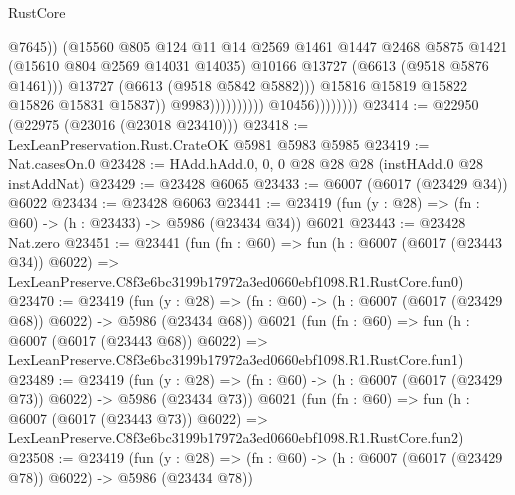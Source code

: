 \begin{lexlean}{RustCore}
\begin{coremodule}
                                                  @7645))
                                              (@15560
                                                @805
                                                @124
                                                @11
                                                @14
                                                @2569
                                                @1461
                                                @1447
                                                @2468
                                                @5875
                                                @1421
                                                (@15610 @804 @2569 @14031 @14035)
                                                @10166
                                                @13727
                                                (@6613 (@9518 @5876 @1461)))
                                              @13727
                                              (@6613 (@9518 @5842 @5882)))
                                            @15816
                                            @15819
                                            @15822
                                            @15826
                                            @15831
                                            @15837))
                                        @9983))))))))))
                    @10456))))))))
@23414 := @22950 (@22975 (@23016 (@23018 @23410)))
@23418 := LexLeanPreservation.Rust.CrateOK @5981 @5983 @5985
@23419 := Nat.casesOn.{0}
@23428 := HAdd.hAdd.{0, 0, 0} @28 @28 @28 (instHAdd.{0} @28 instAddNat)
@23429 := @23428 @6065
@23433 := @6007 (@6017 (@23429 @34)) @6022
@23434 := @23428 @6063
@23441 := @23419 (fun (y : @28) => (fn : @60) -> (h : @23433) -> @5986 (@23434 @34)) @6021
@23443 := @23428 Nat.zero
@23451 := @23441
    (fun (fn : @60) =>
    fun (h : @6007 (@6017 (@23443 @34)) @6022) =>
    LexLeanPreserve.C8f3e6bc3199b17972a3ed0660ebf1098.R1.RustCore.fun0)
@23470 := @23419
    (fun (y : @28) => (fn : @60) -> (h : @6007 (@6017 (@23429 @68)) @6022) -> @5986 (@23434 @68))
    @6021
    (fun (fn : @60) =>
    fun (h : @6007 (@6017 (@23443 @68)) @6022) =>
    LexLeanPreserve.C8f3e6bc3199b17972a3ed0660ebf1098.R1.RustCore.fun1)
@23489 := @23419
    (fun (y : @28) => (fn : @60) -> (h : @6007 (@6017 (@23429 @73)) @6022) -> @5986 (@23434 @73))
    @6021
    (fun (fn : @60) =>
    fun (h : @6007 (@6017 (@23443 @73)) @6022) =>
    LexLeanPreserve.C8f3e6bc3199b17972a3ed0660ebf1098.R1.RustCore.fun2)
@23508 := @23419
    (fun (y : @28) => (fn : @60) -> (h : @6007 (@6017 (@23429 @78)) @6022) -> @5986 (@23434 @78))

\end{coremodule}
\end{lexlean}
